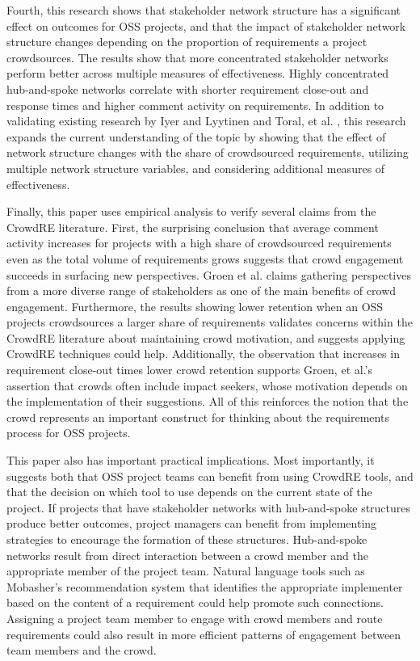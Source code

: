 Fourth, this research shows that stakeholder network structure has a significant effect on outcomes for OSS projects, and that the impact of stakeholder network structure changes depending on the proportion of requirements a project crowdsources. The results show that more concentrated stakeholder networks perform better across multiple measures of effectiveness. Highly concentrated hub-and-spoke networks correlate with shorter requirement close-out and response times and higher comment activity on requirements. In addition to validating existing research by Iyer and Lyytinen \cite{iyer} and Toral, et al. \cite{toral}, this research expands the current understanding of the topic by showing that the effect of network structure changes with the share of crowdsourced requirements, utilizing multiple network structure variables, and considering additional measures of effectiveness.

Finally, this paper uses empirical analysis to verify several claims from the CrowdRE literature. First, the surprising conclusion that average comment activity increases for projects with a high share of crowdsourced requirements even as the total volume of requirements grows suggests that crowd engagement succeeds in surfacing new perspectives. Groen et al. \cite{groen} claims gathering perspectives from a more diverse range of stakeholders as one of the main benefits of crowd engagement. Furthermore, the results showing lower retention when an OSS projects crowdsources a larger share of requirements validates concerns within the \mbox{CrowdRE} literature \cite{snijders, snijders2, levy} about maintaining crowd motivation, and suggests applying CrowdRE techniques could help. Additionally, the observation that increases in requirement close-out times lower crowd retention supports Groen, et al.'s \cite{groen} assertion that crowds often include impact seekers, whose motivation depends on the implementation of their suggestions. All of this reinforces the notion that the crowd represents an important construct for thinking about the requirements process for OSS projects.

This paper also has important practical implications. Most importantly, it suggests both that OSS project teams can benefit from using CrowdRE tools, and that the decision on which tool to use depends on the current state of the project. If projects that have stakeholder networks with hub-and-spoke structures produce better outcomes, project managers can benefit from implementing strategies to encourage the formation of these structures. Hub-and-spoke networks result from direct interaction between a crowd member and the appropriate member of the project team. Natural language tools such as Mobasher's \cite{mobasher} recommendation system that identifies the appropriate implementer based on the content of a requirement could help promote such connections. Assigning a project team member to engage with crowd members and route requirements could also result in more efficient patterns of engagement between team members and the crowd.

